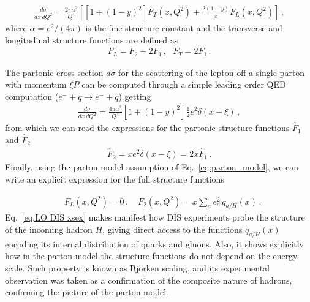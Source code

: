\begin{align}
    \label{general cross xsec DIS}
    \frac{d\sigma}{dx\, dQ^2} = \frac{2\pi \alpha^2}{Q^4}\left[\left[1+\left(1-y\right)^2\right]F_T\left(x,Q^2\right) 
    +\frac{2\left(1-y\right)}{x}F_L\left(x,Q^2\right)\right]\,,
\end{align}
where $\alpha = e^2/\left(4\pi\right)$ is the fine structure constant and the transverse and longitudinal structure functions 
are defined as
\begin{align}
    F_L = F_2 -2F_1\,, \,\,\,\, F_T = 2F_1\,.
\end{align}

%
The partonic cross section $d\hat{\sigma}$ for the scattering of the lepton off a single parton with momentum $\xi P$
can be computed through a simple leading order QED computation ($e^- + q \rightarrow e^- + q $) getting
\begin{align}
    \frac{d\hat{\sigma}}{dx\, dQ^2} = 
    \frac{4\pi \alpha^2}{Q^4}\left[1+\left(1-y\right)^2\right]\frac{1}{2} e^2\delta\left(x-\xi\right)\,,
\end{align}
from which we can read the expressions for the partonic structure functions 
$\hat{F}_1$ and $\hat{F}_2$
\begin{align}
    \hat{F}_2 = x e^2 \delta\left(x-\xi\right) = 2x \hat{F}_1\,.
\end{align}
%
Finally, using the parton model assumption of Eq.~\eqref{eq:parton_model}, we can write
an explicit expression for the full structure functions

\begin{align}
    \label{eq:LO DIS xsex}
    &F_L\left(x,Q^2\right) = 0\,,\,\,\,\,\,\, 
    F_2\left(x,Q^2\right) = x\sum_a e_a^2\, q_{a/H}\left(x\right)\,. 
\end{align} 
Eq.~\ref{eq:LO DIS xsex} makes manifest how DIS experiments probe the structure of the incoming hadron $H$,
giving direct access to the functions $q_{a/H}\left(x\right) $ encoding its internal distribution of quarks and gluons.
Also, it shows explicitly how in the parton model the structure functions do not depend on the energy scale.
Such property is known as Bjorken scaling, and its experimental observation was taken as a confirmation
of the composite nature of hadrons, confirming the picture of the parton model.

